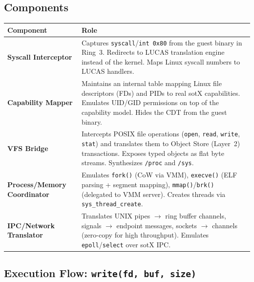 \documentclass[11pt,a4paper]{article}
\begin{document}
\subsection{Components}

\begin{center}
\begin{tabularx}{\textwidth}{lX}
\toprule
\textbf{Component} & \textbf{Role} \\
\midrule
\textbf{Syscall Interceptor} &
  Captures \texttt{syscall}/\texttt{int 0x80} from the guest binary in Ring~3.
  Redirects to LUCAS translation engine instead of the kernel.
  Maps Linux syscall numbers to LUCAS handlers. \\
\midrule
\textbf{Capability Mapper} &
  Maintains an internal table mapping Linux file descriptors (FDs) and PIDs
  to real sotX capabilities. Emulates UID/GID permissions on top of the
  capability model. Hides the CDT from the guest binary. \\
\midrule
\textbf{VFS Bridge} &
  Intercepts POSIX file operations (\texttt{open}, \texttt{read}, \texttt{write}, \texttt{stat})
  and translates them to Object Store (Layer~2) transactions.
  Exposes typed objects as flat byte streams. Synthesizes \texttt{/proc} and \texttt{/sys}. \\
\midrule
\textbf{Process/Memory Coordinator} &
  Emulates \texttt{fork()} (CoW via VMM), \texttt{execve()} (ELF parsing + segment mapping),
  \texttt{mmap()}/\texttt{brk()} (delegated to VMM server).
  Creates threads via \texttt{sys\_thread\_create}. \\
\midrule
\textbf{IPC/Network Translator} &
  Translates UNIX pipes $\rightarrow$ ring buffer channels,
  signals $\rightarrow$ endpoint messages,
  sockets $\rightarrow$ channels (zero-copy for high throughput).
  Emulates \texttt{epoll}/\texttt{select} over sotX IPC. \\
\bottomrule
\end{tabularx}
\end{center}

\subsection{Execution Flow: \texttt{write(fd, buf, size)}}
\end{document}
